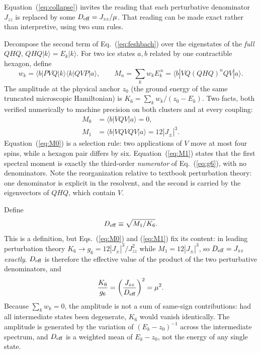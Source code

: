 \documentclass[aps,prb,preprint,amsmath,amssymb,superscriptaddress,
longbibliography,floatfix]{revtex4-2}
\newcommand{\Jzz}{J_{zz}}
\newcommand{\Jpm}{J_{\pm}}
\newcommand{\Deff}{D_{\rm eff}}
\begin{document}
Equation~(\ref{eq:collapse}) invites the reading that each perturbative
denominator $\Jzz$ is replaced by some $\Deff=\Jzz/\mu$.  That reading can be
made exact rather than interpretive, using two sum rules.

Decompose the second term of Eq.~(\ref{eq:feshbach}) over the eigenstates of
the \emph{full} $QHQ$, $QHQ|k\rangle=E_k|k\rangle$.  For two ice states $a,b$
related by one contractible hexagon, define
\begin{equation}
 w_k=\langle b|PVQ|k\rangle\langle k|QVP|a\rangle,\qquad
 M_n=\sum_k w_kE_k^{\,n}=\langle b|VQ(QHQ)^nQV|a\rangle .
 \label{eq:moments}
\end{equation}
The amplitude at the physical anchor $z_0$ (the ground energy of the same
truncated microscopic Hamiltonian) is $K_6=\sum_k w_k/(z_0-E_k)$.  Two facts,
both verified numerically to machine precision on both clusters and at every
coupling:
\begin{align}
 M_0&=\langle b|VQV|a\rangle=0,
 \label{eq:M0}\\
 M_1&=\langle b|VQVQV|a\rangle=12|\Jpm|^3 .
 \label{eq:M1}
\end{align}
Equation~(\ref{eq:M0}) is a selection rule: two applications of $V$ move at
most four spins, while a hexagon pair differs by six.  Equation~(\ref{eq:M1})
states that the first spectral moment is exactly the third-order
\emph{numerator} of Eq.~(\ref{eq:g6}), with no denominators.  Note the
reorganization relative to textbook perturbation theory: one denominator is
explicit in the resolvent, and the second is carried by the eigenvectors of
$QHQ$, which contain $V$.

Define
\begin{equation}
 \Deff\equiv\sqrt{M_1/K_6} .
 \label{eq:Deff}
\end{equation}
This is a definition, but Eqs.~(\ref{eq:M0}) and (\ref{eq:M1}) fix its content:
in leading perturbation theory $K_6\rightarrow g_6=12|\Jpm|^3/\Jzz^2$ while
$M_1=12|\Jpm|^3$, so $\Deff=\Jzz$ \emph{exactly}.  $\Deff$ is therefore the
effective value of the product of the two perturbative denominators, and
\begin{equation}
 \frac{K_6}{g_6}=\left(\frac{\Jzz}{\Deff}\right)^2=\mu^2 .
 \label{eq:mudef}
\end{equation}
Because $\sum_kw_k=0$, the amplitude is not a sum of same-sign contributions:
had all intermediate states been degenerate, $K_6$ would vanish identically.
The amplitude is generated by the variation of $(E_k-z_0)^{-1}$ across the
intermediate spectrum, and $\Deff$ is a weighted mean of $E_k-z_0$, not the
energy of any single state.
\end{document}
